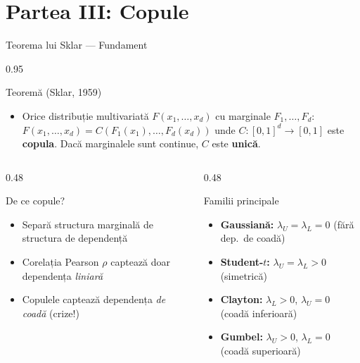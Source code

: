 \documentclass[9pt, aspectratio=169, t]{beamer}
\begin{document}
\section{Partea III: Copule}

\begin{frame}{Teorema lui Sklar --- Fundament}
    \begin{cminipage}{0.95\textwidth}
\begin{block}{Teoremă (Sklar, 1959)}
\begin{itemize}\setlength{\itemsep}{0pt}
    \item Orice distribuție multivariată $F(x_1, \ldots, x_d)$ cu marginale $F_1, \ldots, F_d$:
    $F(x_1, \ldots, x_d) = C(F_1(x_1), \ldots, F_d(x_d))$
    unde $C: [0,1]^d \to [0,1]$ este \textbf{copula}. Dacă marginalele sunt continue, $C$ este \textbf{unică}.
\end{itemize}
\end{block}
\vspace{0.1cm}
\begin{columns}[T]
\begin{column}{0.48\textwidth}
\begin{alertblock}{De ce copule?}
\begin{itemize}\setlength{\itemsep}{0pt}
    \item Separă structura marginală de structura de dependență
    \item Corelația Pearson $\rho$ captează doar dependența \textit{liniară}
    \item Copulele captează dependența \textit{de coadă} (crize!)
\end{itemize}
\end{alertblock}
\end{column}
\begin{column}{0.48\textwidth}
\begin{exampleblock}{Familii principale}
\begin{itemize}\setlength{\itemsep}{0pt}
    \item \textbf{Gaussiană:} $\lambda_U = \lambda_L = 0$ (fără dep.\ de coadă)
    \item \textbf{Student-$t$:} $\lambda_U = \lambda_L > 0$ (simetrică)
    \item \textbf{Clayton:} $\lambda_L > 0$, $\lambda_U = 0$ (coadă inferioară)
    \item \textbf{Gumbel:} $\lambda_U > 0$, $\lambda_L = 0$ (coadă superioară)
\end{itemize}
\end{exampleblock}
\end{column}
\end{columns}
    \end{cminipage}
\end{frame}
\end{document}
